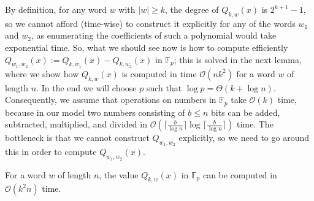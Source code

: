 \documentclass[runningheads]{llncs}
\newcommand{\bigo}{{\mathcal{O}}}
\begin{document}
By definition, for any word $w$ with $|w|\geq k$, the degree of $Q_{k,w}(x)$ is $2^{k+1}-1$, so we cannot afford (time-wise) to construct it explicitly for any of the words $w_1$ and $w_2$, as enumerating the coefficients of such a polynomial would take exponential time. So, what we should see now is how to compute efficiently $Q_{w_1,w_2}(x) := Q_{k,w_{1}}(x)-Q_{k,w_{2}}(x)$ in $\mathbb{F}_{p}$; this is solved in the next lemma, where we show how $Q_{k,w}(x)$ is computed in time $\bigo(nk^{2})$ for a word $w$ of length $n$.
In the end we will choose $p$ such that $\log p = \Theta(k+\log n)$. Consequently, we assume that
operations on numbers in $\mathbb{F}_{p}$ take $\bigo(k)$ time, because in our model two numbers consisting of
$b\leq n$ bits can be added, subtracted, multiplied, and divided in $\bigo(\lceil\frac{b}{\log n}\rceil\log\lceil\frac{b}{\log n}\rceil)$ time.
The bottleneck is that we cannot construct $Q_{w_1,w_2}$ explicitly, so we need to go around this in order to compute $Q_{w_1,w_2}(x)$.
\begin{lemma}
For a word $w$ of length $n$, the value $Q_{k,w}(x)$ in $\mathbb{F}_p$ can be computed in $\mathcal{O}(k^{2}n)$ time.
\end{lemma}
\end{document}
